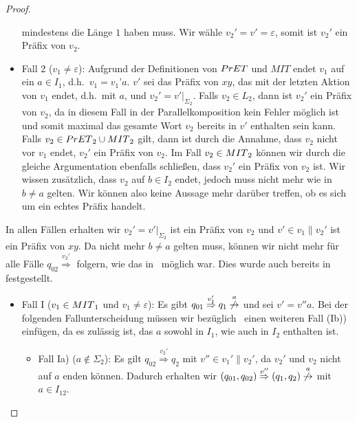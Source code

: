 \begin{proof}
\begin{itemize}
      mindestens die Länge $1$ haben muss. Wir wähle
      $v_2'=v'=\varepsilon$, somit ist $v_2'$ ein Präfix von $v_2$.
    \item Fall 2 ($v_1\neq\varepsilon$): Aufgrund der Definitionen von $PrET{}$
      und $MIT$ endet $v_1$ auf ein $a\in I_1$, d.h.\ $v_1=v_1’a$. $v'$ sei das
      Präfix von $xy$, das mit der letzten Aktion von $v_1$ endet, d.h.\ mit
      $a$, und $v_2'=v'|_{\Sigma _{2}}$. Falls $v_2\in L_2$, dann ist
      $v_2'$ ein Präfix von $v_2$, da in diesem Fall in der
      Parallelkomposition kein Fehler möglich ist und somit maximal das gesamte Wort $v_2$ bereits in
      $v'$ enthalten sein kann. Falls $v_2\in
      PrET{}_2\cup MIT{}_2$ gilt, dann ist durch die Annahme, dass $v_2$ nicht vor
      $v_1$ endet, $v_2'$ ein Präfix von $v_2$. Im Fall $v_2\in MIT{}_2$ können
      wir durch die gleiche Argumentation ebenfalls schließen, dass $v_2'$ ein
      Präfix von $v_2$ ist. Wir wissen zusätzlich, dass $v_2$ auf $b\in
      I_2$ endet, jedoch muss nicht mehr wie in~\cite{Vogler2014EIO} $b\neq a$
      gelten. Wir können also keine Aussage mehr darüber treffen, ob es sich um
      ein echtes Präfix handelt.
  \end{itemize}
  In allen Fällen erhalten wir $v_2'=v'|_{\Sigma _2}$ ist ein Präfix von $v_2$
  und $v'\in v_1\| v_2'$ ist ein Präfix von $xy$. Da nicht mehr $b\neq a$
  gelten muss, können wir nicht mehr für alle Fälle
  $q_{02}\overset{v_2'}{\Rightarrow}$ folgern, wie das in~\cite{Vogler2014EIO}
  möglich war. Dies wurde auch bereits in~\cite{Schlosser2012BA} festgestellt.
  \begin{itemize}
    \item Fall I ($v_1\in MIT{}_1$ und $v_1\neq\varepsilon$): Es gibt $q_{01}
      \overset{v_1'}{\Rightarrow}q_1
      \overset{a}{\not{\hspace{-0.1cm}\rightarrow}}$ und sei $v'=v''a$. Bei der
      folgenden Fallunterscheidung müssen wir bezüglich~\cite{Vogler2014EIO}
      einen weiteren Fall (Ib)) einfügen, da es zulässig ist, das $a$ sowohl in
      $I_1$, wie auch in $I_2$ enthalten ist.
      \begin{itemize}
        \item Fall Ia) ($a\notin\Sigma _2$): Es gilt $q_{02}
          \overset{v_2'}{\Rightarrow} q_2$ mit $v''\in v_1'\|v_2'$, da $v_2'$
          und $v_2$ nicht auf $a$ enden können. Dadurch erhalten
          wir $(q_{01},q_{02}) \overset{v''}{\Rightarrow} (q_1,q_2)
          \overset{a}{\not{\hspace{-0.1cm}\rightarrow}}$ mit $a\in I_{12}$.

\end{itemize}
\end{itemize}
\end{proof}
